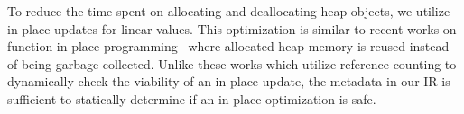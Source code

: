 To reduce the time spent on allocating and deallocating heap objects, we utilize
in-place updates for linear values. This optimization is similar to recent works on
function in-place programming~\cite{lorenzen23,perceus} where allocated heap memory
is reused instead of being garbage collected. Unlike these works which utilize reference
counting to dynamically check the viability of an in-place update, the metadata in our 
IR is sufficient to statically determine if an in-place optimization is safe.